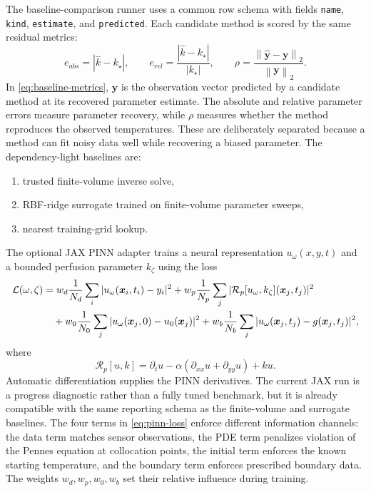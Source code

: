 \documentclass[11pt]{article}
\numberwithin{equation}{section}
\newcommand{\norm}[1]{\left\lVert #1 \right\rVert}
\begin{document}
The baseline-comparison runner uses a common row schema with fields
\texttt{name}, \texttt{kind}, \texttt{estimate}, and \texttt{predicted}.  Each
candidate method is scored by the same residual metrics:
\begin{equation}
  e_{abs}=|\widehat{k}-k_\star|,
  \qquad
  e_{rel}=\frac{|\widehat{k}-k_\star|}{|k_\star|},
  \qquad
  \rho=\frac{\norm{\widehat{\bm{y}}-\bm{y}}_2}{\norm{\bm{y}}_2}.
  \label{eq:baseline-metrics}
\end{equation}
In \cref{eq:baseline-metrics}, $\widehat{\bm{y}}$ is the observation vector
predicted by a candidate method at its recovered parameter estimate.  The
absolute and relative parameter errors measure parameter recovery, while
$\rho$ measures whether the method reproduces the observed temperatures.
These are deliberately separated because a method can fit noisy data well while
recovering a biased parameter.
The dependency-light baselines are:
\begin{enumerate}[label=\arabic*.]
  \item trusted finite-volume inverse solve,
  \item RBF-ridge surrogate trained on finite-volume parameter sweeps,
  \item nearest training-grid lookup.
\end{enumerate}
The optional JAX PINN adapter trains a neural representation
$u_\omega(x,y,t)$ and a bounded perfusion parameter $k_\zeta$ using the loss
\begin{align}
  \mathcal{L}(\omega,\zeta)
  &=
  w_d
  \frac{1}{N_d}
  \sum_i
  |u_\omega(\bm{x}_i,t_i)-y_i|^2
  +
  w_p
  \frac{1}{N_p}
  \sum_j
  |\mathcal{R}_p[u_\omega,k_\zeta](\bm{x}_j,t_j)|^2
  \notag\\
  &\quad+
  w_0
  \frac{1}{N_0}
  \sum_j
  |u_\omega(\bm{x}_j,0)-u_0(\bm{x}_j)|^2
  +
  w_b
  \frac{1}{N_b}
  \sum_j
  |u_\omega(\bm{x}_j,t_j)-g(\bm{x}_j,t_j)|^2,
  \label{eq:pinn-loss}
\end{align}
where
\begin{equation}
  \mathcal{R}_p[u,k]
  =
  \partial_t u
  -
  \alpha(\partial_{xx}u+\partial_{yy}u)
  +
  k u.
  \label{eq:pinn-residual}
\end{equation}
Automatic differentiation supplies the PINN derivatives.  The current JAX run
is a progress diagnostic rather than a fully tuned benchmark, but it is already
compatible with the same reporting schema as the finite-volume and surrogate
baselines.
The four terms in \cref{eq:pinn-loss} enforce different information channels:
the data term matches sensor observations, the PDE term penalizes violation of
the Pennes equation at collocation points, the initial term enforces the known
starting temperature, and the boundary term enforces prescribed boundary data.
The weights $w_d,w_p,w_0,w_b$ set their relative influence during training.
\end{document}
